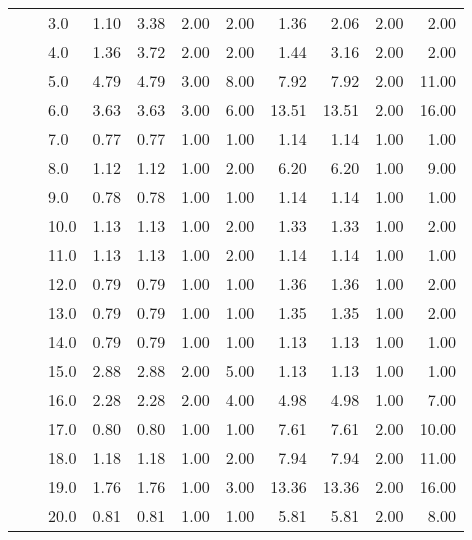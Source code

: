 \begin{tabular}{lllrrrrrrrr}
       &     & 3.0  &       1.10 &      3.38 &  2.00 &   2.00 &       1.36 &      2.06 & 2.00 &   2.00 \\
       &     & 4.0  &       1.36 &      3.72 &  2.00 &   2.00 &       1.44 &      3.16 & 2.00 &   2.00 \\
       &     & 5.0  &       4.79 &      4.79 &  3.00 &   8.00 &       7.92 &      7.92 & 2.00 &  11.00 \\
       &     & 6.0  &       3.63 &      3.63 &  3.00 &   6.00 &      13.51 &     13.51 & 2.00 &  16.00 \\
       &     & 7.0  &       0.77 &      0.77 &  1.00 &   1.00 &       1.14 &      1.14 & 1.00 &   1.00 \\
       &     & 8.0  &       1.12 &      1.12 &  1.00 &   2.00 &       6.20 &      6.20 & 1.00 &   9.00 \\
       &     & 9.0  &       0.78 &      0.78 &  1.00 &   1.00 &       1.14 &      1.14 & 1.00 &   1.00 \\
       &     & 10.0 &       1.13 &      1.13 &  1.00 &   2.00 &       1.33 &      1.33 & 1.00 &   2.00 \\
       &     & 11.0 &       1.13 &      1.13 &  1.00 &   2.00 &       1.14 &      1.14 & 1.00 &   1.00 \\
       &     & 12.0 &       0.79 &      0.79 &  1.00 &   1.00 &       1.36 &      1.36 & 1.00 &   2.00 \\
       &     & 13.0 &       0.79 &      0.79 &  1.00 &   1.00 &       1.35 &      1.35 & 1.00 &   2.00 \\
       &     & 14.0 &       0.79 &      0.79 &  1.00 &   1.00 &       1.13 &      1.13 & 1.00 &   1.00 \\
       &     & 15.0 &       2.88 &      2.88 &  2.00 &   5.00 &       1.13 &      1.13 & 1.00 &   1.00 \\
       &     & 16.0 &       2.28 &      2.28 &  2.00 &   4.00 &       4.98 &      4.98 & 1.00 &   7.00 \\
       &     & 17.0 &       0.80 &      0.80 &  1.00 &   1.00 &       7.61 &      7.61 & 2.00 &  10.00 \\
       &     & 18.0 &       1.18 &      1.18 &  1.00 &   2.00 &       7.94 &      7.94 & 2.00 &  11.00 \\
       &     & 19.0 &       1.76 &      1.76 &  1.00 &   3.00 &      13.36 &     13.36 & 2.00 &  16.00 \\
       &     & 20.0 &       0.81 &      0.81 &  1.00 &   1.00 &       5.81 &      5.81 & 2.00 &   8.00 \\

\end{tabular}
